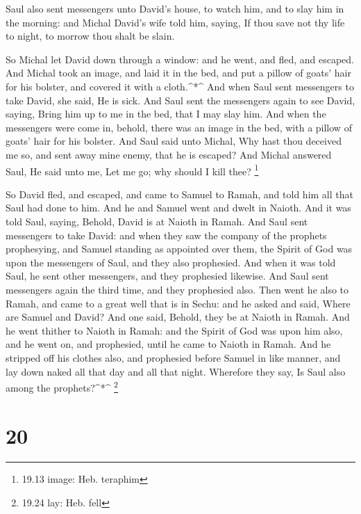  Saul also sent messengers unto David's house, to watch
him, and to slay him in the morning: and Michal David's wife told him,
saying, If thou save not thy life to night, to morrow thou shalt be
slain.

 So Michal let David down through a window: and he went,
and fled, and escaped.  And Michal took an image, and laid
it in the bed, and put a pillow of goats' hair for his bolster, and
covered it with a cloth.\^{}*\^{}  And when Saul sent
messengers to take David, she said, He is sick.  And Saul
sent the messengers again to see David, saying, Bring him up to me in
the bed, that I may slay him.  And when the messengers were
come in, behold, there was an image in the bed, with a pillow of goats'
hair for his bolster.  And Saul said unto Michal, Why hast
thou deceived me so, and sent away mine enemy, that he is escaped? And
Michal answered Saul, He said unto me, Let me go; why should I kill
thee? \footnote{19.13 image: Heb. teraphim}

 So David fled, and escaped, and came to Samuel to Ramah,
and told him all that Saul had done to him. And he and Samuel went and
dwelt in Naioth.  And it was told Saul, saying, Behold,
David is at Naioth in Ramah.  And Saul sent messengers to
take David: and when they saw the company of the prophets prophesying,
and Samuel standing as appointed over them, the Spirit of God was upon
the messengers of Saul, and they also prophesied.  And when
it was told Saul, he sent other messengers, and they prophesied
likewise. And Saul sent messengers again the third time, and they
prophesied also.  Then went he also to Ramah, and came to a
great well that is in Sechu: and he asked and said, Where are Samuel and
David? And one said, Behold, they be at Naioth in Ramah. 
And he went thither to Naioth in Ramah: and the Spirit of God was upon
him also, and he went on, and prophesied, until he came to Naioth in
Ramah.  And he stripped off his clothes also, and
prophesied before Samuel in like manner, and lay down naked all that day
and all that night. Wherefore they say, Is Saul also among the
prophets?\^{}*\^{} \footnote{19.24 lay: Heb. fell}

\hypertarget{section-19}{%
\section{20}\label{section-19}}

